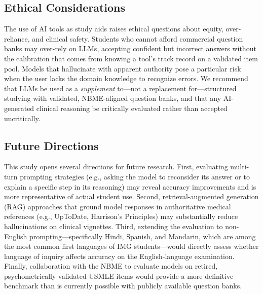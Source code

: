 \subsection{Ethical Considerations}

The use of AI tools as study aids raises ethical questions about equity, over-reliance, and clinical safety. Students who cannot afford commercial question banks may over-rely on LLMs, accepting confident but incorrect answers without the calibration that comes from knowing a tool's track record on a validated item pool. Models that hallucinate with apparent authority pose a particular risk when the user lacks the domain knowledge to recognize errors. We recommend that LLMs be used as a \textit{supplement} to—not a replacement for—structured studying with validated, NBME-aligned question banks, and that any AI-generated clinical reasoning be critically evaluated rather than accepted uncritically.

\subsection{Future Directions}

This study opens several directions for future research. First, evaluating multi-turn prompting strategies (e.g., asking the model to reconsider its answer or to explain a specific step in its reasoning) may reveal accuracy improvements and is more representative of actual student use. Second, retrieval-augmented generation (RAG) approaches that ground model responses in authoritative medical references (e.g., UpToDate, Harrison's Principles) may substantially reduce hallucinations on clinical vignettes. Third, extending the evaluation to non-English prompting—specifically Hindi, Spanish, and Mandarin, which are among the most common first languages of IMG students—would directly assess whether language of inquiry affects accuracy on the English-language examination. Finally, collaboration with the NBME to evaluate models on retired, psychometrically validated USMLE items would provide a more definitive benchmark than is currently possible with publicly available question banks.
